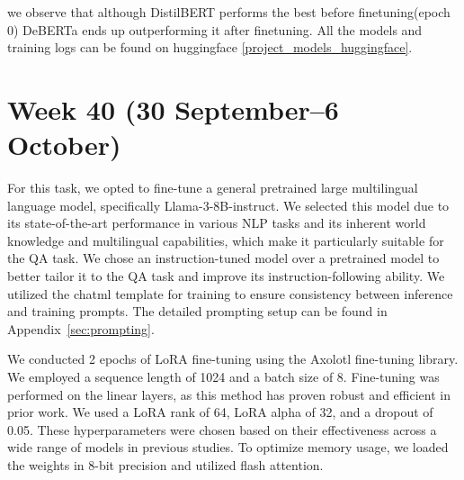 \documentclass[11pt]{article}
\begin{document}
we observe that although DistilBERT performs the best before finetuning(epoch 0) DeBERTa ends up outperforming it after finetuning. All the models and training logs can be found on huggingface \ref{project_models_huggingface}.

\section{Week 40 (30 September--6 October)}
\label{sec:week40}

For this task, we opted to fine-tune a general pretrained large multilingual language model, specifically Llama-3-8B-instruct. 
We selected this model due to its state-of-the-art performance in various NLP tasks and its inherent world knowledge and multilingual capabilities, which make it particularly suitable for the QA task.
We chose an instruction-tuned model over a pretrained model to better tailor it to the QA task and improve its instruction-following ability.
We utilized the chatml template for training to ensure consistency between inference and training prompts.
The detailed prompting setup can be found in Appendix~\vref{sec:prompting}.

We conducted 2 epochs of LoRA fine-tuning \cite{hu2021loralowrankadaptationlarge} using the Axolotl fine-tuning library. We employed a sequence length of 1024 and a batch size of 8. 
Fine-tuning was performed on the linear layers, as this method has proven robust and efficient in prior work.
We used a LoRA rank of 64, LoRA alpha of 32, and a dropout of 0.05. 
These hyperparameters were chosen based on their effectiveness across a wide range of models in previous studies.
To optimize memory usage, we loaded the weights in 8-bit precision and utilized flash attention.

\begin{table}[ht]
    \centering
    \caption{Performance comparison of pre-fine-tuned and fine-tuned Llama-3-8B models}
    \label{fig:llama3_performance_comparison_week40}
\end{table}
\end{document}

